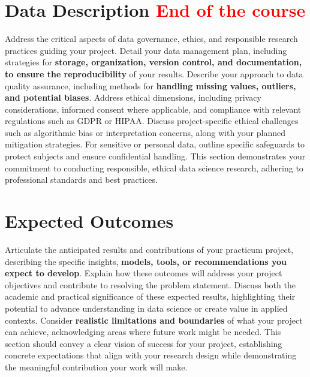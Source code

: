 \documentclass[12pt, onecolumn]{IEEEtran}
\begin{document}
\section{Data Description \textcolor{red}{End of the course}}
Address the critical aspects of data governance, ethics, and responsible research practices guiding your project. Detail your data management plan, including strategies for \textbf{storage, organization, version control, and documentation, to ensure the reproducibility} of your results. Describe your approach to data quality assurance, including methods for \textbf{handling missing values, outliers, and potential biases}. Address ethical dimensions, including privacy considerations, informed consent where applicable, and compliance with relevant regulations such as GDPR or HIPAA. Discuss project-specific ethical challenges such as algorithmic bias or interpretation concerns, along with your planned mitigation strategies. For sensitive or personal data, outline specific safeguards to protect subjects and ensure confidential handling. This section demonstrates your commitment to conducting responsible, ethical data science research, adhering to professional standards and best practices.


\section{Expected Outcomes}
Articulate the anticipated results and contributions of your practicum project, describing the specific insights, \textbf{models, tools, or recommendations you expect to develop}. Explain how these outcomes will address your project objectives and contribute to resolving the problem statement. Discuss both the academic and practical significance of these expected results, highlighting their potential to advance understanding in data science or create value in applied contexts. Consider \textbf{realistic limitations and boundaries} of what your project can achieve, acknowledging areas where future work might be needed. This section should convey a clear vision of success for your project, establishing concrete expectations that align with your research design while demonstrating the meaningful contribution your work will make.
\end{document}
